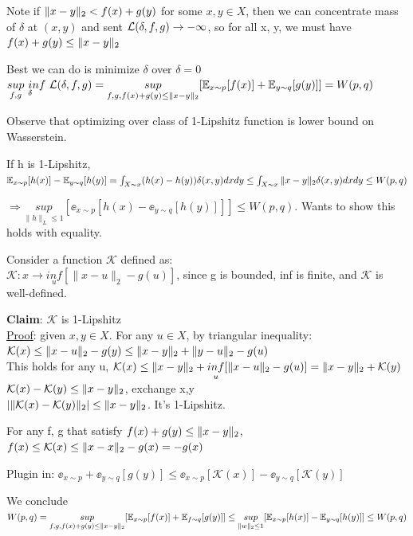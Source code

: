 \documentclass[12pt,a4paper]{article}
\begin{document}
Note if $\|x-y\|_2<f(x)+g(y)$ for some $x,y\in X$, then we can concentrate mass of $\delta$ at $(x,y)$ and sent $\mathcal{L} (\delta, f,g)\rightarrow -\infty$, so for all x, y, we must have $f(x)+g(y)\le \|x-y\|_2$

Best we can do is minimize $\delta$ over $\delta=0$\\
$\underset{f,g}{sup}\ \underset{\delta}inf\ \lossl(\delta, f,g)=\underset{f,g,f(x)+g(y)\le \norm{x-y}}{sup} [\ee_{x\sim p}[f(x)]+\ee_{y\sim q}[g(y)]]=W(p,q)$

Observe that optimizing over class of 1-Lipshitz function is lower bound on Wasserstein. 

If h is 1-Lipshitz,\\
$\mathbb{E}_{x\sim p}[h(x)]-\mathbb{E}_{y\sim q}[h(y)]=\int_{X\sim x}(h(x)-h(y))\delta(x,y)dxdy\\
\le \int_{X\sim x}\|x-y\|_2\delta(x,y)dxdy\\
\le W(p,q)$

$\Rightarrow \underset{\|h\|_L\le 1}{sup}[\ee_{x\sim p}[h(x)-\ee_{y\sim q}[h(y)]]]\le W(p, q)$. 
Wants to show this holds with equality. 

Consider a function $\mathcal{K}$ defined as:\\
$\mathcal{K}: x\rightarrow \underset{u}{inf}[\|x-u\|_2-g(u)]$, since g is bounded, inf is finite, and $\mathcal{K}$ is well-defined.

\textbf{Claim}: $\mathcal{K}$ is 1-Lipshitz\\
\underline{Proof}: given $x,y\in X$. For any $u\in X$, by triangular inequality:\\
$\mathcal{K}(x)\le \|x-u\|_2-g(y)\le \|x-y\|_2+\|y-u\|_2-g(u)$\\
This holds for any u, $\mathcal{K}(x)\le \|x-y\|_2+\underset{u}{inf} [\|x-u\|_2-g(u)]=\|x-y\|_2+\mathcal{K}(y)$\\
$\mathcal{K}(x)-\mathcal{K}(y)\le \|x-y\|_2$, exchange x,y\\
$|\|\mathcal{K}(x)-\mathcal{K}(y)\|_2|\le \|x-y\|_2$. It's 1-Lipshitz. 

For any f, g that satisfy $f(x)+g(y)\le\|x-y\|_2$,\\ 
$f(x)\le \mathcal{K}(x)\le \|x-x\|_2-g(x)=-g(x)$

Plugin in: $\ee_{x\sim p} +\ee_{y\sim q}[g(y)] \le \ee_{x\sim p}[\mathcal{K}(x)]-\ee_{y\sim q}[\mathcal{K}(y)]$

We conclude\\
$W(p,q)=\underset{f,g,f(x)+g(y)\le \|x-y\|_2}{sup}[\mathbb{E}_{x\sim p}[f(x)]+\mathbb{E}_{f\sim q}[g(y)]]
\le \underset{\|w\|_2\le 1}{sup}[\mathbb{E}_{x\sim p}[h(x)]-\mathbb{E}_{y\sim q}[h(y)]]\le W(p,q)$
\end{document}
